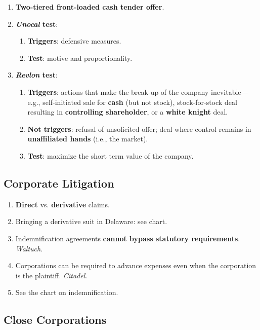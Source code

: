\begin{enumerate}
    \item \textbf{Two-tiered front-loaded cash tender offer}.
    \item \textbf{\emph{Unocal} test}:
    \begin{enumerate}
        \item \textbf{Triggers}: defensive measures.
        \item \textbf{Test}: motive and proportionality.
    \end{enumerate}
    \item \textbf{\emph{Revlon} test}:
    \begin{enumerate}
        \item \textbf{Triggers}: actions that make the break-up of the company 
        inevitable---e.g., self-initiated sale for \textbf{cash} (but not 
        stock), stock-for-stock deal resulting in \textbf{controlling 
        shareholder}, or a \textbf{white knight} deal.
        \item \textbf{Not triggers}: refusal of unsolicited offer; deal where 
        control remains in \textbf{unaffiliated hands} (i.e., the market).
        \item \textbf{Test}: maximize the short term value of the company.
    \end{enumerate}
\end{enumerate}

\newpage

\subsection{Corporate Litigation}

\begin{enumerate}
    \item \textbf{Direct} vs. \textbf{derivative} claims.
    \item Bringing a derivative suit in Delaware: see chart.
    \item Indemnification agreements \textbf{cannot bypass statutory 
    requirements}. \emph{Waltuch}.
    \item Corporations can be required to advance expenses even when the 
    corporation is the plaintiff. \emph{Citadel}.
    \item See the chart on indemnification.
\end{enumerate}

\newpage

\subsection{Close Corporations}

